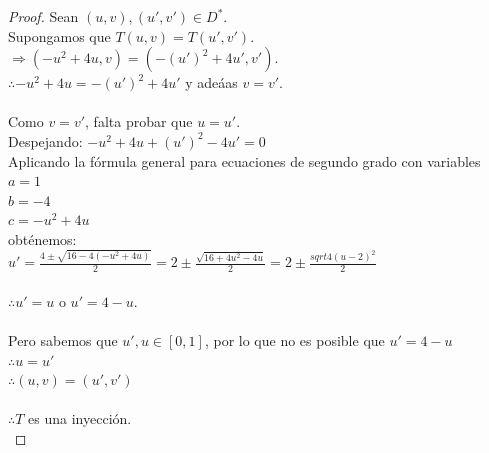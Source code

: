 \documentclass[10pt,letterpaper,fleqn]{article}
\begin{document}
\begin{enumerate}
        \begin{proof}
        \vspace{0.2cm}
        Sean $(u,v), (u', v') \in D^*$.\\
        Supongamos que $T(u, v) = T(u', v')$.\\
        $\Rightarrow (-u^2 + 4u, v) = (-(u')^2 + 4u', v')$.\\
        $\therefore -u^2 + 4u = -(u')^2 + 4u'$ y adeáas $v = v'$.\\\\
        Como $v = v'$, falta probar que $u = u'$.\\
        Despejando: $-u^2 + 4u + (u')^2 - 4u' = 0$\\
        Aplicando la fórmula general para ecuaciones de segundo grado con variables\\
        $a = 1$\\
        $b = -4$\\
        $c = -u^2 + 4u$\\
        obténemos:\\
        $u' = \frac{4 \pm \sqrt{16 - 4(-u^2 + 4u)}}{2} = 2 \pm \frac{\sqrt{16 + 4 u^2 - 4u}}{2} = 2 \pm \frac{sqrt{4(u-2)^2}}{2}$\\\\
        $\therefore u' = u$ o $u' = 4 - u$.\\\\
        Pero sabemos que $u', u \in [0,1]$, por lo que no es posible que $u' = 4-u$\\
        $\therefore u = u'$\\
        $\therefore (u, v) = (u', v')$\\\\
        $\therefore T$ es una inyección.\\
		\end{proof}          
        

\end{enumerate}
\end{document}
